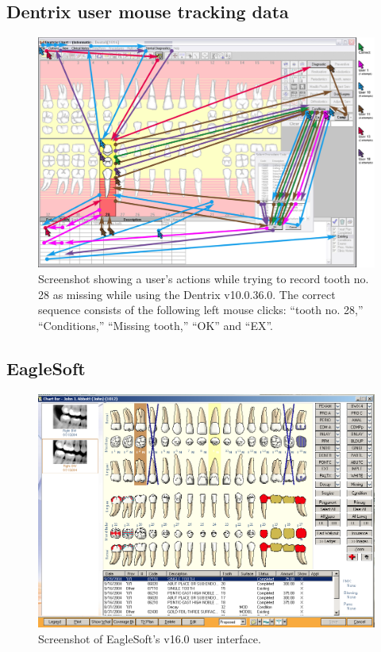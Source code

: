 \documentclass[11pt]{article}
\begin{document}
\newpage

\subsection{Dentrix user mouse tracking data}
\label{dentrixusabil}
\begin{figure}[h]
\begin{center}
\includegraphics[width=\textwidth]{dentrixuse.png}
\end{center}
\caption{Screenshot showing a user's actions while trying to record tooth no. 28 as missing while using the Dentrix v10.0.36.0. The correct sequence consists of the following left mouse clicks: ``tooth no. 28,'' ``Conditions,'' ``Missing tooth,'' ``OK'' and ``EX''\cite{Thyvalikakath2008A-usability-eva}.}
\end{figure}

\newpage
\subsection{EagleSoft}
\label{ES}
\begin{figure}[h]
\begin{center}
\includegraphics[width=\textwidth]{esss.png}
\end{center}
\caption{Screenshot of EagleSoft's v16.0 user interface.}
\end{figure}
\end{document}
